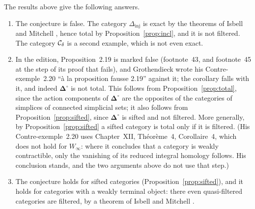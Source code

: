 The results above give the following answers.
\begin{enumerate}
\item The conjecture is false. The category $\Delta_{\mathrm{inj}}$ is exact
 by the theorems of Isbell and Mitchell \cite[Theorems~1 and~3]{IM73}, hence total
 by Proposition~\ref{prop:incl}, and it is not filtered. The category $\mathcal{C}_{\delta}$
 is a second example, which is not even exact.
\item In the edition, Proposition~2.19 is marked false (footnote~43, and
 footnote~45 at the step of its proof that fails), and Grothendieck wrote his
 Contre-exemple~2.20 ``\`a la proposition fausse 2.19'' against it; the corollary falls with it, and indeed
 $\boldsymbol\Delta^{\circ}$ is not total. This follows from
 Proposition~\ref{prop:total}, since the action components of
 $\boldsymbol\Delta^{\circ}$ are the opposites of the categories of simplices
 of connected simplicial sets; it also follows from
 Proposition~\ref{prop:sifted}, since $\boldsymbol\Delta^{\circ}$ is sifted
 and not filtered. More generally, by Proposition~\ref{prop:sifted} a sifted
 category is total only if it is filtered. (His Contre-exemple~2.20 uses
 Chapter~XII, Th\'eor\`eme~4, Corollaire~4, which does not hold for
 $W_\infty$: where it concludes that a category is weakly contractible, only
 the vanishing of its reduced integral homology follows. His conclusion
 stands, and the two arguments above do not use that step.)
\item The conjecture holds for sifted categories
 (Proposition~\ref{prop:sifted}), and it holds for categories with a weakly
 terminal object: there even quasi-filtered categories are filtered, by a
 theorem of Isbell and Mitchell \cite[Corollary~4.4]{IM76}.
\end{enumerate}
